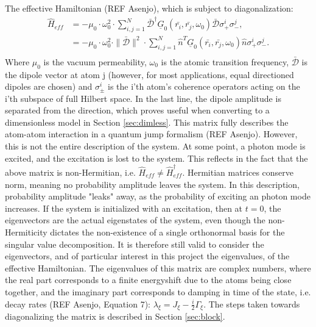 \documentclass{article}
\begin{document}
The effective Hamiltonian (REF Asenjo), which is subject to diagonalization:
\begin{equation}\label{eq:Heff}
    \begin{split}
        \hat{H}_{eff} &= - \mu_0 \cdot \omega_0^2 \cdot \sum_{i,j = 1}^N \bar{\mathscr{D}}^\dagger \underline{G}_0(\bar{r_i}, \bar{r_j}, \omega_0) \bar{\mathscr{D}} \sigma_+^i \sigma_-^j, \\
        &=- \mu_0 \cdot \omega_0^2 \cdot \|\bar{\mathscr{D}}\|^2 \cdot \sum_{i,j = 1}^N \hat{n}^T \underline{G}_0(\bar{r_i}, \bar{r_j}, \omega_0) \hat{n} \sigma_+^i \sigma_-^j. \\
    \end{split}
\end{equation}
Where $\mu_0$ is the vacuum permeability, $\omega_0$ is the atomic transition frequency, $\bar{\mathscr{D}}$ is the dipole vector at atom j (however, for most applications, equal directioned dipoles are chosen) and $\sigma_\pm^i$ is the i'th atom's coherence operators acting on the i'th subspace of full Hilbert space. In the last line, the dipole amplitude is separated from the direction, which proves useful when converting to a dimensionless model in Section \ref{sec:dimless}. This matrix fully describes the atom-atom interaction in a quantum jump formalism (REF Asenjo). However, this is not the entire description of the system. At some point, a photon mode is excited, and the excitation is lost to the system. This reflects in the fact that the above matrix is non-Hermitian, i.e. $\hat{H}_{eff} \neq \hat{H}_{eff}^\dagger$. Hermitian matrices conserve norm, meaning no probability amplitude leaves the system. In this description, probability amplitude "leaks" away, as the probability of exciting an photon mode increases. If the system is initialized with an excitation, then at $t=0$, the eigenvectors are the actual eigenstates of the system, even though the non-Hermiticity dictates the non-existence of a single orthonormal basis for the singular value decomposition. It is therefore still valid to consider the eigenvectors, and of particular interest in this project the eigenvalues, of the effective Hamiltonian. The eigenvalues of this matrix are complex numbers, where the real part corresponds to a finite energyshift due to the atoms being close together, and the imaginary part corresponds to damping in time of the state, i.e. decay rates (REF Asenjo, Equation 7): $\lambda_\xi = J_\xi - \frac{i}{2} \Gamma_\xi$. The steps taken towards diagonalizing the matrix is described in Section \ref{sec:block}. 
\end{document}

